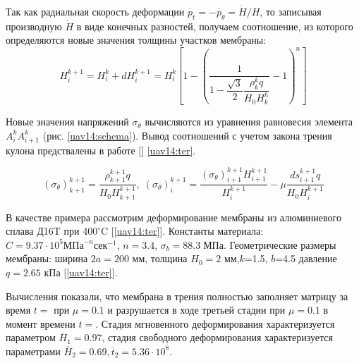 \documentclass[a4paper,12pt, openany]{memoir}
\numberwithin{equation}{chapter}
\numberwithin{figure}{chapter}
\begin{document}
 Так как радиальная скорость деформации $\dot{p_t} = -\dot{p_\theta}={\dot{H}}/{H}$, то записывая производную 
 $\dot{H}$ в виде конечных разностей, получаем соотношение, из которого определяются новые значения толщины участков мембраны:
 \begin{equation}
 H^{k+1}_i = H^k_i + dH^{k+1}_i = H_i^k\left[1-\left(\dfrac{1}{1-\dfrac{\sqrt{3}}{2}\dfrac{\rho_k^kq}{H_0H^h_k}}-1\right)^n\right]
\label{uav14:f7}
\end{equation}

Новые значения напряжений $\sigma_\theta$ вычисляются из уравнения равновесия элемента $A_i^kA_{i+1}^k$ (рис. \ref{uav14:schema}). Вывод соотношений с учетом закона трения кулона предствалены в работе [] \ref{uav14:ter}.

 \begin{equation}
 (\sigma_\theta)^{k+1}_{k+1} = \dfrac{\rho^{k+1}_{k+1}q}{H_0H^{k+1}_{k+1}}, \; (\sigma_\theta)^{k+1}_i =
 \dfrac{(\sigma_\theta)^{k+1}_{i+1}H^{k+1}_{i+1}}{H^{k+1}_{i}} - \mu\dfrac{ds^{k+1}_{i+1}q}{H_0H^{k+1}_i}
\label{uav14:f8}
\end{equation}

\begin{figure}[h!]
\begin{minipage}[m]{0.27\linewidth}
\vspace*{10pt}	
  \label{uav14:pic1}
  \caption{ }
\end{minipage}
\hfill
\hspace*{20pt}
\begin{minipage}[h]{0.7\linewidth}
  \label{uav14:pic}
  \caption{ }
\end{minipage}


\end{figure}

В качестве примера рассмотрим деформирование мембраны из алюминиевого сплава Д16T при $400^\circ\text{C}$ [\ref{uav14:ter}]. Константы материала:
   $C=9.37\cdot10^5 \text{МПа}^{-n}\text{сек}^{-1}$, $n=3.4$, $\sigma_b = 88.3\; \text{МПа}$.
   Геометрические размеры мембраны: ширина $2a=200$ мм, толщина $H_0=2$ мм,$k$=1.5, $\overline{b}$=4.5 давление $q=2.65$ кПа [\ref{uav14:ter}].
   
   Вычисления показали, что мембрана в трения полностью заполняет матрицу за время $t = $ при $\mu=0.1$ и разрушается в ходе третьей стадии при $\mu=0.1$ в момент времени $t = $.
   Стадия мгновенного деформирования характеризуется параметром $\overline{H}_1 = 0.97$,
   стадия свободного деформирования характеризуется параметрами $\overline{H}_2 = 0.69, \overline{t}_2 = 5.36 \cdot 10^8$.
  
\end{document}

